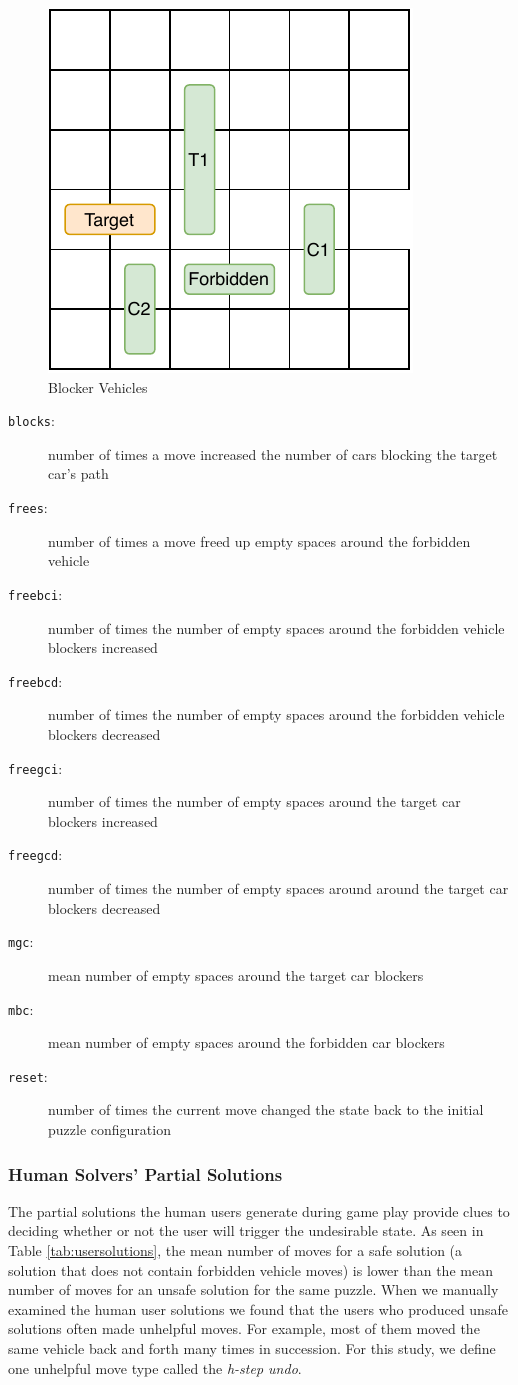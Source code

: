 \documentclass[doctor]{thesis} %
\theoremstyle{plain}
\begin{document}
\begin{figure}[htb]
  \centering
\includegraphics[width=0.35\columnwidth]{img/blockers.pdf}
  \caption{Blocker Vehicles}
  \label{fig:blockers}
\end{figure}
\begin{description}
\item[\texttt{blocks}:] number of times a move increased the number of cars blocking the target car's path
\item[\texttt{frees}:] number of times a move freed up empty spaces around the forbidden vehicle
\item[\texttt{freebci}:] number of times the number of empty spaces around the forbidden vehicle blockers increased
\item[\texttt{freebcd}:] number of times the number of empty spaces around the forbidden vehicle blockers decreased
\item[\texttt{freegci}:] number of times the number of empty spaces around the target car blockers increased
\item[\texttt{freegcd}:] number of times the number of empty spaces around around the target car blockers decreased
\item[\texttt{mgc}:] mean number of empty spaces around the target car blockers
\item[\texttt{mbc}:] mean number of empty spaces around the forbidden car blockers
\item[\texttt{reset}:] number of times the current move changed the state back to the initial puzzle configuration
\end{description}

\subsubsection*{Human Solvers' Partial Solutions}
The partial solutions the human users generate during game play provide clues to deciding whether or not the user will trigger the undesirable state. As seen in Table \ref{tab:usersolutions}, the mean number of moves for a safe solution (a solution that does not contain forbidden vehicle moves) is lower than the mean number of moves for an unsafe solution for the same puzzle. When we manually examined the human user solutions we found that the users who produced unsafe solutions often made unhelpful moves. For example, most of them moved the same vehicle back and forth many times in succession. For this study, we define one unhelpful move type called the \textit{h-step undo}.
\end{document}
